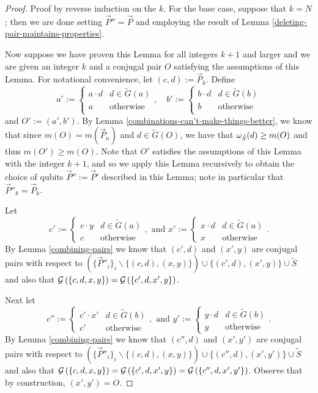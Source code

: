 \documentclass[twocolumn,showpacs,preprintnumbers,amsmath,amssymb,nofootinbib,pra,floatfix]{revtex4-1}
\newcommand{\lst}{\vec}
\newcommand{\set}{\tilde}
\newcommand{\genfun}{\mathcal{G}}
\begin{document}
\begin{proof}
Proof by reverse induction on the $k$.  For the base case, suppose that $k=N$; then we are done setting $\lst P''=\lst P$ and employing the result of Lemma \ref{deleting-pair-maintains-properties}.

Now suppose we have proven this Lemma for all integers $k+1$ and larger and we are given an integer $k$ and a conjugal pair $O$ satisfying the assumptions of this Lemma.  For notational convenience, let $(c,d):=\lst P_k$.
Define
$$
a' :=
\begin{cases}
a\cdot d & d\in\set G(a) \\
a & \text{otherwise} \\
\end{cases},
\quad
b' :=
\begin{cases}
b\cdot d & d\in\set G(b) \\
b & \text{otherwise} \\
\end{cases}
$$
and $O':=(a',b')$.  By Lemma \ref{combinations-can't-make-things-better}, we know that since $m(O)=m(\lst P_n)$ and $d\in\set G(O)$, we have that $\om_{\set S}(d)\ge m(O)$ and thus $m(O')\ge m(O)$.  Note that $O'$ satisfies the assumptions of this Lemma with the integer $k+1$, and so we apply this Lemma recursively to obtain the choice of qubits $\lst P'':=\lst P'$ described in this Lemma;  note in particular that $\lst P''_k=\lst P_k$.

Let 
$$
c' :=
\begin{cases}
c\cdot y & d\in\set G(a) \\
c & \text{otherwise}
\end{cases},
\,\, \text{and} \,\,
x' :=
\begin{cases}
x\cdot d & d\in\set G(a) \\
x & \text{otherwise}
\end{cases}.
$$
By Lemma \ref{combining-pairs} we know that $(c',d)$ and $(x',y)$ are conjugal pairs with respect to $(\{\lst P''_i\}_i\backslash \{(c,d),(x,y)\})\cup\{(c',d),(x',y)\}\cup\set S$ and also that $\genfun\paren{\{c,d,x,y\}}=\genfun\paren{\{c',d,x',y\}}$.

Next let
$$
c'' :=
\begin{cases}
c'\cdot x' & d\in\set G(b) \\
c' & \text{otherwise}
\end{cases},
\,\, \text{and} \,\,
y' :=
\begin{cases}
y\cdot d & d\in\set G(b) \\
y & \text{otherwise}
\end{cases}.
$$
By Lemma \ref{combining-pairs} we know that $(c'',d)$ and $(x',y')$ are conjugal pairs with respect to $(\{\lst P''_i\}_i\backslash \{(c,d),(x,y)\})\cup\{(c'',d),(x',y')\}\cup\set S$ and also that $\genfun\paren{\{c,d,x,y\}}=\genfun\paren{\{c',d,x',y\}}=\genfun\paren{\{c'',d,x',y'\}}$.  Observe that by construction, $(x',y')=O$.


\end{proof}
\end{document}

